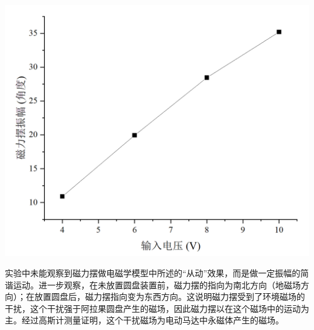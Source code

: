 \documentclass{CLGPY}
\begin{document}
\begin{multicols}{1}
        \begin{center}
            \includegraphics[scale=.18]{./fig/20210616205713.png}
        \end{center}

实验中未能观察到磁力摆做电磁学模型中所述的“从动”效果，而是做一定振幅的简谐运动。进一步观察，在未放置圆盘装置前，磁力摆的指向为南北方向（地磁场方向）；在放置圆盘后，磁力摆指向变为东西方向。这说明磁力摆受到了环境磁场的干扰，这个干扰强于阿拉果圆盘产生的磁场，因此磁力摆以在这个磁场中的运动为主。经过高斯计测量证明，这个干扰磁场为电动马达中永磁体产生的磁场。


\end{multicols}
\end{document}
